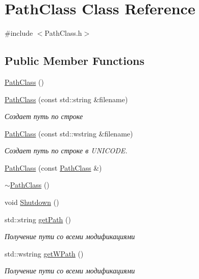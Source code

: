 \hypertarget{class_path_class}{}\section{Path\+Class Class Reference}
\label{class_path_class}


{\ttfamily \#include $<$Path\+Class.\+h$>$}

\subsection*{Public Member Functions}
\begin{DoxyCompactItemize}
\item 
\hyperlink{class_path_class_a13b1f0b300889f096151e0fc2a6890a6}{Path\+Class} ()
\item 
\hyperlink{class_path_class_ac14304bfe63bb472ea21311226e706c0}{Path\+Class} (const std\+::string \&filename)
\begin{DoxyCompactList}\small\item\em Создает путь по строке \end{DoxyCompactList}\item 
\hyperlink{class_path_class_a46518182c742d1fa71a574bbf13654c4}{Path\+Class} (const std\+::wstring \&filename)
\begin{DoxyCompactList}\small\item\em Создает путь по строке в U\+N\+I\+C\+O\+DE. \end{DoxyCompactList}\item 
\hyperlink{class_path_class_ad5bad062639725c865cd5c1826a4da3e}{Path\+Class} (const \hyperlink{class_path_class}{Path\+Class} \&)
\item 
\hyperlink{class_path_class_a7eea4d10f8252ba6963e8fd770e53e29}{$\sim$\+Path\+Class} ()
\item 
void \hyperlink{class_path_class_a1ec074523795b82189f6c0ac6e4371f6}{Shutdown} ()
\item 
std\+::string \hyperlink{class_path_class_a4f6e38c297fca1b064e38d03b7876024}{get\+Path} ()
\begin{DoxyCompactList}\small\item\em Получение пути со всеми модификациями \end{DoxyCompactList}\item 
std\+::wstring \hyperlink{class_path_class_a1056eec1f69de932c586b01c100b4549}{get\+W\+Path} ()
\begin{DoxyCompactList}\small\item\em Получение пути со всеми модификациями \end{DoxyCompactList}\item 

\end{DoxyCompactItemize}
